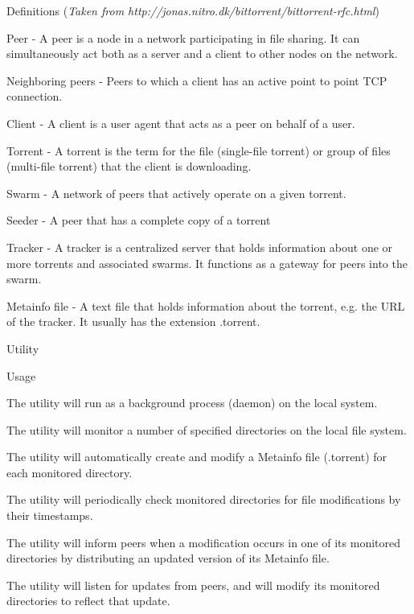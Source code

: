 \documentclass[12 pt]{article}
\begin{document}
	\begin{enum}
		\item Definitions (\textit{Taken from http://jonas.nitro.dk/bittorrent/bittorrent-rfc.html})
		\begin{enum}
			\item Peer - A peer is a node in a network participating in file sharing. It can simultaneously act both as a server and a client to other nodes on the network.
			\item Neighboring peers - Peers to which a client has an active point to point TCP connection.
			\item Client - A client is a user agent that acts as a peer on behalf of a user.
			\item Torrent - A torrent is the term for the file (single-file torrent) or group of files (multi-file torrent) that the client is downloading.
			\item Swarm - A network of peers that actively operate on a given torrent.
			\item Seeder - A peer that has a complete copy of a torrent
			\item Tracker - A tracker is a centralized server that holds information about one or more torrents and associated swarms. It functions as a gateway for peers into the swarm.
			\item Metainfo file - A text file that holds information about the torrent, e.g. the URL of the tracker. It usually has the extension .torrent.
		\end{enum}
		\item Utility
		\begin{enum}
			\item Usage
			\begin{enum}
				\item The utility will run as a background process (daemon) on the local system.
				\item The utility will monitor a number of specified directories on the local file system.
				\item The utility will automatically create and modify a Metainfo file (.torrent) for each monitored directory.
				\item The utility will periodically check monitored directories for file modifications by their timestamps.
				\item The utility will inform peers when a modification occurs in one of its monitored directories by distributing an updated version of its Metainfo file.
				\item The utility will listen for updates from peers, and will modify its monitored directories to reflect that update.

\end{enum}
\end{enum}
\end{enum}
\end{document}
